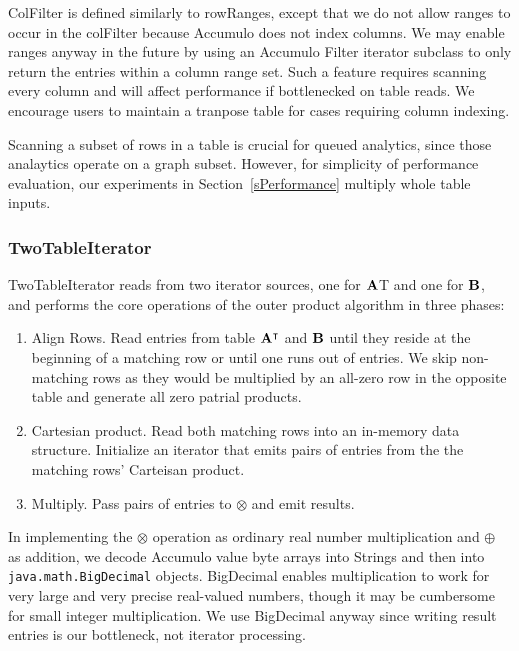 ColFilter is defined similarly to rowRanges, except that we do not allow ranges to occur in the colFilter
because Accumulo does not index columns.  We may enable ranges anyway in the future by using an Accumulo
Filter iterator subclass to only return the entries within a column range set.
Such a feature requires scanning every column and will affect performance if bottlenecked on table reads.
We encourage users to maintain a tranpose table for cases requiring column indexing.

Scanning a subset of rows in a table is crucial for queued analytics, since those analaytics 
operate on a graph subset.  However, for simplicity of performance evaluation, 
our experiments in Section~\ref{sPerformance} multiply whole table inputs.

\subsubsection{TwoTableIterator}
TwoTableIterator reads from two iterator sources, one for $\mathbf{A}$T and one for $\mathbf{B}$,
and performs the core operations of the outer product algorithm in three phases:
\begin{enumerate}
\item Align Rows.  Read entries from table $\mathbf{A^{\intercal}}$ and $\mathbf{B}$ until they reside at the beginning of a matching row
or until one runs out of entries. We skip non-matching rows as they would be multiplied by an all-zero row in the
opposite table and generate all zero patrial products.
\item Cartesian product. Read both matching rows into an in-memory data structure. 
Initialize an iterator that emits pairs of entries from the the matching rows' Carteisan product.
\item Multiply. Pass pairs of entries to $\otimes$ and emit results. 
\end{enumerate}

In implementing the $\otimes$ operation as ordinary real number multiplication and $\oplus$ as addition,
we decode Accumulo value byte arrays into Strings and then into \texttt{java.math.BigDecimal}
objects. BigDecimal enables multiplication to work for very large and very precise real-valued numbers,
though it may be cumbersome for small integer multiplication. We use BigDecimal anyway since 
writing result entries is our bottleneck, not iterator processing.


